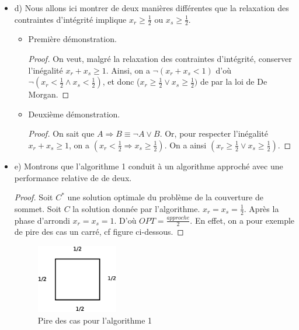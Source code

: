 \begin{itemize}
\begin{proof}
minimiser le nombre de sommets et le simplexe est adéquat. Le résultat
est donc absurde et contredit notre hypothèse de départ.
\end{proof}
\item[] d) Nous allons ici montrer de deux manières différentes que la
  relaxation des contraintes d'intégrité implique $x_r \geq
  \frac{1}{2}$ ou $x_s \geq \frac{1}{2}$.
\begin{itemize}
\item Première démonstration.
\begin{proof}
On veut, malgré la relaxation des contraintes d'intégrité, conserver
l'inégalité $x_r + x_s \geq 1$. Ainsi, on a $\neg (x_r + x_s < 1)$
d'où $\neg (x_r < \frac{1}{2} \wedge x_s < \frac{1}{2})$, et donc
($x_r \geq \frac{1}{2} \vee x_s \geq \frac{1}{2}) $ de par la loi de
De Morgan.
\end{proof}
\item Deuxième démonstration.
\begin{proof}
On sait que $A \Rightarrow B \equiv \neg A \vee B$. 
Or, pour respecter l'inégalité $x_r + x_s \geq 1$, on a $(x_r <
\frac{1}{2} \Rightarrow x_s \geq \frac{1}{2})$. On a ainsi $(x_r \geq
\frac{1}{2} \vee x_s \geq \frac{1}{2})$. 
\end{proof}
\end{itemize}
\item[] e) Montrons que l'algorithme 1 conduit à un algorithme
  approché avec une performance relative de de deux. 
\begin{proof}
Soit $C^{*}$ une solution optimale du problème de la couverture de
sommet. Soit $C$ la solution donnée par l'algorithme. 
$x_r=x_s=\frac{1}{2}$. Après la phase d'arrondi $x_r=x_s= 1$. D'où $
OPT = \frac{approche}{2}$.
En effet, on a pour exemple de pire des cas un carré, cf figure
ci-dessous.
\end{proof}

\begin{figure}
\begin{center}
\includegraphics[height=3cm]{carre.eps}
\end{center}
\caption{Pire des cas pour l'algorithme 1}
\end{figure}


\end{itemize}
